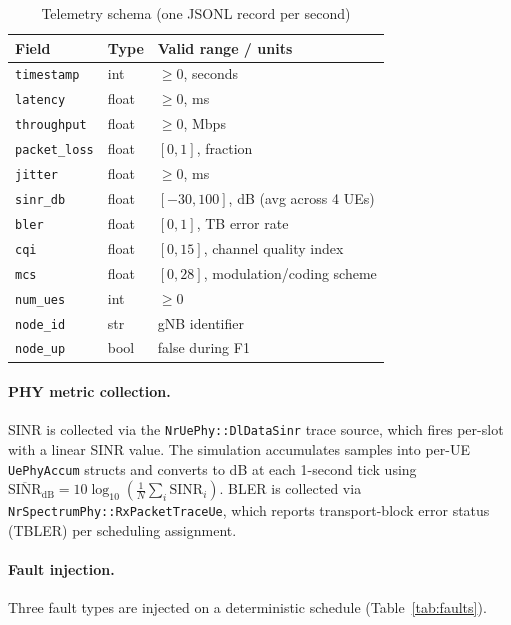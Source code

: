 \documentclass[12pt,a4paper]{article}
\begin{document}
\begin{table}[H]
\centering
\caption{Telemetry schema (one JSONL record per second)}
\label{tab:schema}
\begin{tabular}{lll}
\toprule
\textbf{Field} & \textbf{Type} & \textbf{Valid range / units} \\
\midrule
\texttt{timestamp}    & int   & $\geq 0$, seconds \\
\texttt{latency}      & float & $\geq 0$, ms \\
\texttt{throughput}   & float & $\geq 0$, Mbps \\
\texttt{packet\_loss} & float & $[0, 1]$, fraction \\
\texttt{jitter}       & float & $\geq 0$, ms \\
\texttt{sinr\_db}     & float & $[-30, 100]$, dB (avg across 4 UEs) \\
\texttt{bler}         & float & $[0, 1]$, TB error rate \\
\texttt{cqi}          & float & $[0, 15]$, channel quality index \\
\texttt{mcs}          & float & $[0, 28]$, modulation/coding scheme \\
\texttt{num\_ues}     & int   & $\geq 0$ \\
\texttt{node\_id}     & str   & gNB identifier \\
\texttt{node\_up}     & bool  & false during F1 \\
\bottomrule
\end{tabular}
\end{table}

\paragraph{PHY metric collection.}
SINR is collected via the \texttt{NrUePhy::DlDataSinr} trace source, which
fires per-slot with a linear SINR value. The simulation accumulates samples
into per-UE \texttt{UePhyAccum} structs and converts to dB at each
1-second tick using $\overline{\mathrm{SINR}}_\mathrm{dB} =
10\log_{10}\!\left(\frac{1}{N}\sum_i \mathrm{SINR}_i\right)$.
BLER is collected via \texttt{NrSpectrumPhy::RxPacketTraceUe}, which reports
transport-block error status (TBLER) per scheduling assignment.

\paragraph{Fault injection.}
Three fault types are injected on a deterministic schedule (Table~\ref{tab:faults}).
\end{document}
